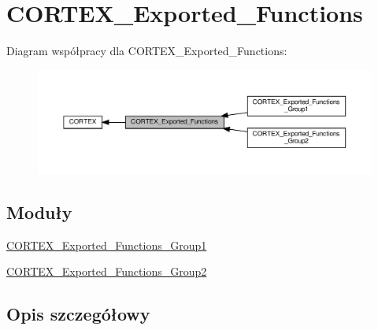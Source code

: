 \hypertarget{group___c_o_r_t_e_x___exported___functions}{}\section{C\+O\+R\+T\+E\+X\+\_\+\+Exported\+\_\+\+Functions}
\label{group___c_o_r_t_e_x___exported___functions}
Diagram współpracy dla C\+O\+R\+T\+E\+X\+\_\+\+Exported\+\_\+\+Functions\+:\nopagebreak
\begin{figure}[H]
\begin{center}
\leavevmode
\includegraphics[width=350pt]{group___c_o_r_t_e_x___exported___functions}
\end{center}
\end{figure}
\subsection*{Moduły}
\begin{DoxyCompactItemize}
\item 
\hyperlink{group___c_o_r_t_e_x___exported___functions___group1}{C\+O\+R\+T\+E\+X\+\_\+\+Exported\+\_\+\+Functions\+\_\+\+Group1}
\item 
\hyperlink{group___c_o_r_t_e_x___exported___functions___group2}{C\+O\+R\+T\+E\+X\+\_\+\+Exported\+\_\+\+Functions\+\_\+\+Group2}
\end{DoxyCompactItemize}


\subsection{Opis szczegółowy}
